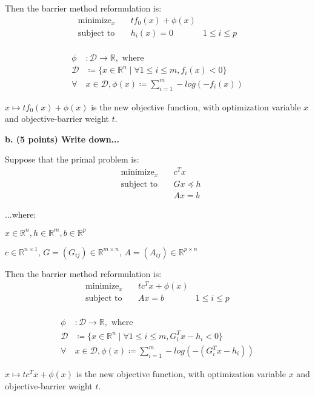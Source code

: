\documentclass[a4paper,10pt]{article}
\theoremstyle{definition}
\begin{document}
Then the barrier method reformulation is: 
\[
\begin{aligned}
    \text{minimize}_{x} \quad & tf_0(x) + \phi(x)\\
    \text{subject to} \quad & h_i(x) = 0 \quad & 1 \leq i \leq p\\
\end{aligned}
\]

\[
\begin{aligned}
    \phi & : \mathcal{D} \rightarrow \mathbb{R}, \text{ where }\\
    \mathcal{D} & \coloneq \{x \in \mathbb{R} ^ n \mid \forall 1\leq i\leq m, f_i(x) < 0\}\\
    \forall & x \in \mathcal{D}, \phi(x) \coloneq \sum_{i=1}^{m} -log(-f_i(x))
\end{aligned}
\]

$x \mapsto tf_0(x) + \phi(x)$ is the new objective function,
with optimization variable $x$ and objective-barrier weight $t$.

\textbf{b. (5 points) Write down...}


Suppose that the primal problem is:
\[
\begin{aligned}
    & \text{minimize}_{x} \quad & c^Tx \\
    & \text{subject to} \quad & Gx \preceq h \\
    & \quad & Ax = b  
\end{aligned}
\]

...where:

$x \in \mathbb{R}^n, h \in \mathbb{R}^m, b \in \mathbb{R}^p$

$c \in \mathbb{R}^{n \times 1}$, $G = (G_{ij}) \in \mathbb{R}^{m \times n}$, $A = (A_{ij}) \in \mathbb{R}^{p \times n}$

Then the barrier method reformulation is: 
\[
\begin{aligned}
    \text{minimize}_{x} \quad & tc^Tx + \phi(x)\\
    \text{subject to} \quad & Ax = b \quad & 1 \leq i \leq p\\
\end{aligned}
\]

\[
\begin{aligned}
    \phi & : \mathcal{D} \rightarrow \mathbb{R}, \text{ where }\\
    \mathcal{D} & \coloneq \{x \in \mathbb{R} ^ n \mid \forall 1\leq i\leq m, G_i^Tx - h_i < 0\}\\
    \forall & x \in \mathcal{D}, \phi(x) \coloneq \sum_{i=1}^{m} -log(-(G_i^Tx - h_i))
\end{aligned}
\]

$x \mapsto tc^Tx + \phi(x)$ is the new objective function,
with optimization variable $x$ and objective-barrier weight $t$.
\end{document}
